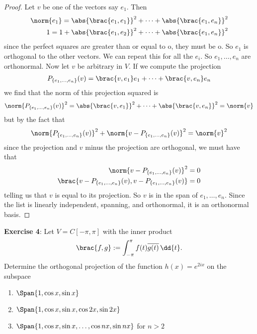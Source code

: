 \documentclass{article}
\begin{document}
\begin{proof}
	Let $v$ be one of the vectors say $e_{1}$. Then 
	\begin{align*}
		\norm{e_{1}} = \abs{\brac{e_{1}, e_{1}}}^{2} + \cdots + \abs{\brac{e_{1}, e_{n}}}^{2} \\
		1 = 1 + \abs{\brac{e_{1}, e_{2}}}^{2} + \cdots + \abs{\brac{e_{1}, e_{n}}}^{2}
	\end{align*}
	since the perfect squares are greater than or equal to o, they must be o. So $e_{1}$ is orthogonal to the other vectors. We can repeat this for all the $e_{i}$. So $e_{1}, \ldots, e_{n}$ are orthonormal. Now let $v$ be arbitrary in $V$. If we compute the projection
	\begin{align*}
		P_{\{e_{1}, \ldots, e_{n}\}}(v) = \brac{v, e_{1}}e_{1} + \cdots + \brac{v, e_{n}}e_{n}
	\end{align*}
	we find that the norm of this projection squared is 
	\begin{align*}
		\norm{P_{\{e_{1}, \ldots, e_{n}\}}(v)}^{2} = \abs{\brac{v, e_{1}}}^{2} + \cdots + \abs{\brac{v, e_{n}}}^{2} = \norm{v}
	\end{align*}
	but by the fact that 
	\begin{equation*}
		\norm{P_{\{e_{1}, \ldots, e_{n}\}}(v)}^{2} + \norm{v - P_{\{e_{1}, \ldots, e_{n}\}}(v)}^{2} = \norm{v}^{2}	
	\end{equation*}
	since the projection and $v$ minus the projection are orthogonal, we must have that 
	\begin{align*}
		\norm{v - P_{\{e_{1}, \ldots, e_{n}\}}(v)}^{2} = 0 \\
		\brac{v - P_{\{e_{1}, \ldots, e_{n}\}}(v), v - P_{\{e_{1}, \ldots, e_{n}\}}(v)} = 0
	\end{align*}
	telling us that $v$ is equal to its projection. So $v$ is in the span of $e_{1}, \ldots, e_{n}$. Since the list is linearly independent, spanning, and orthonormal, it is an orthonormal basis. 
\end{proof}
\textbf{Exercise 4}: Let $V = C[-\pi, \pi]$ with the inner product
\begin{equation*}
	\brac{f, g} := \int_{-\pi}^{\pi} f(t)\overline{g(t)} \,\dd{t}.
\end{equation*}
Determine the orthogonal projection of the function $h(x) = e^{2ix}$ on the subspace
\begin{enumerate}
	\item $\Span\{1, \cos{x}, \sin{x}\}$

	\item $\Span\{1, \cos{x}, \sin{x}, \cos{2x}, \sin{2x}\}$

	\item $\Span\{1, \cos{x}, \sin{x}, \ldots, \cos{nx}, \sin{nx}\}$ for $n > 2$
\end{enumerate}
\end{document}
